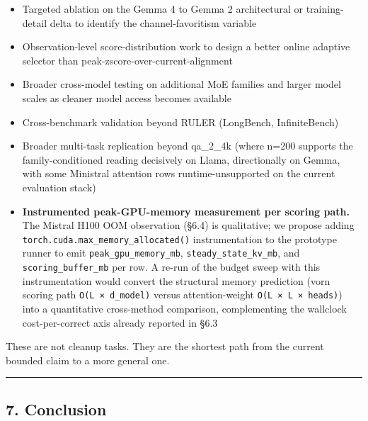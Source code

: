 \documentclass[
]{article}
\providecommand{\tightlist}{%
  \setlength{\itemsep}{0pt}\setlength{\parskip}{0pt}}
\begin{document}
\begin{itemize}
\tightlist
\item
  Targeted ablation on the Gemma 4 to Gemma 2 architectural or
  training-detail delta to identify the channel-favoritism variable
\item
  Observation-level score-distribution work to design a better online
  adaptive selector than peak-zscore-over-current-alignment
\item
  Broader cross-model testing on additional MoE families and larger
  model scales as cleaner model access becomes available
\item
  Cross-benchmark validation beyond RULER (LongBench, InfiniteBench)
\item
  Broader multi-task replication beyond qa\_2\_4k (where n=200 supports
  the family-conditioned reading decisively on Llama, directionally on
  Gemma, with some Ministral attention rows runtime-unsupported on the
  current evaluation stack)
\item
  \textbf{Instrumented peak-GPU-memory measurement per scoring path.}
  The Mistral H100 OOM observation (§6.4) is qualitative; we propose
  adding \texttt{torch.\allowbreak{}cuda.\allowbreak{}max\_memory\_allocated()} instrumentation to
  the prototype runner to emit \texttt{peak\_gpu\_memory\_mb},
  \texttt{steady\_state\_kv\_mb}, and \texttt{scoring\_buffer\_mb} per
  row. A re-run of the budget sweep with this instrumentation would
  convert the structural memory prediction (vorn scoring path
  \texttt{O(L\ ×\ d\_model)} versus attention-weight
  \texttt{O(L\ ×\ L\ ×\ heads)}) into a quantitative cross-method
  comparison, complementing the wallclock cost-per-correct axis already
  reported in §6.3
\end{itemize}

These are not cleanup tasks. They are the shortest path from the current
bounded claim to a more general one.

\begin{center}\rule{0.5\linewidth}{0.5pt}\end{center}

\subsection{7. Conclusion}\label{7-conclusion}
\end{document}

